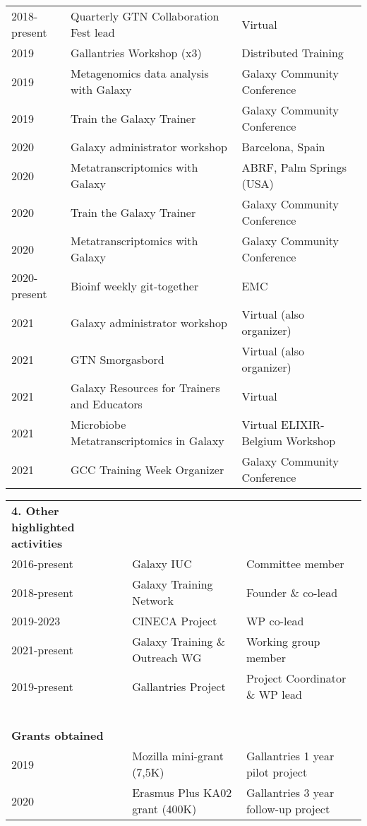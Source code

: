 \begin{table}[h!]
\begin{tabular}{lll}
        2018-present & Quarterly GTN Collaboration Fest lead   & Virtual \\
        2019 & Gallantries Workshop (x3)                       & Distributed Training \\
        2019 & Metagenomics data analysis with Galaxy          & Galaxy Community Conference \\
        2019 & Train the Galaxy Trainer                        & Galaxy Community Conference \\
        2020 & Galaxy administrator workshop                   & Barcelona, Spain \\
        2020 & Metatranscriptomics with Galaxy                 & ABRF, Palm Springs (USA) \\
        2020 & Train the Galaxy Trainer                        & Galaxy Community Conference \\
        2020 & Metatranscriptomics with Galaxy                 & Galaxy Community Conference \\
        2020-present & Bioinf weekly git-together              & EMC \\
        2021 & Galaxy administrator workshop                   & Virtual (also organizer) \\
        2021 & GTN Smorgasbord                                 & Virtual (also organizer) \\
        2021 & Galaxy Resources for Trainers and Educators     & Virtual  \\
        2021 & Microbiobe Metatranscriptomics in Galaxy        & Virtual ELIXIR-Belgium Workshop \\
        2021 & GCC Training Week Organizer                     & Galaxy Community Conference \\
    \end{tabular}
\end{table}

\begin{table}
    \begin{tabular}{lll}
        \textbf{4.  Other highlighted activities} \\

        2016-present & Galaxy IUC & Committee member \\
        2018-present & Galaxy Training Network & Founder \& co-lead  \\
        2019-2023 & CINECA Project & WP co-lead  \\
        2021-present & Galaxy Training \& Outreach WG & Working group member \\
        2019-present & Gallantries Project & Project Coordinator \& WP lead \\
        \ \\
        \textbf{Grants obtained} \\
         2019 & Mozilla mini-grant (7,5K) & Gallantries 1 year pilot project  \\
         2020 & Erasmus Plus KA02 grant (400K) & Gallantries 3 year follow-up project \\
    \end{tabular}
\end{table}



\normalsize
